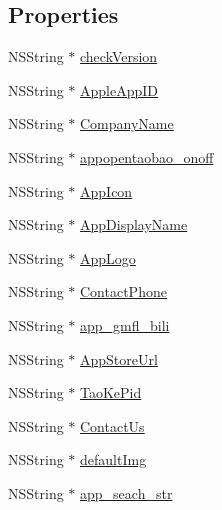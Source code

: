 \subsection*{Properties}
\begin{DoxyCompactItemize}
\item 
N\+S\+String $\ast$ \mbox{\hyperlink{interface_f_n_base_setting_model_a9b61d4642d2dae6e92ced036db029cb7}{check\+Version}}
\item 
N\+S\+String $\ast$ \mbox{\hyperlink{interface_f_n_base_setting_model_aaa406322c65ff07bd8f1f5cb75303974}{Apple\+App\+ID}}
\item 
N\+S\+String $\ast$ \mbox{\hyperlink{interface_f_n_base_setting_model_a66531865767e7f8c301e8d370e1ce1e1}{Company\+Name}}
\item 
N\+S\+String $\ast$ \mbox{\hyperlink{interface_f_n_base_setting_model_adc96e0283db91f335e004db7edbbf956}{appopentaobao\+\_\+onoff}}
\item 
N\+S\+String $\ast$ \mbox{\hyperlink{interface_f_n_base_setting_model_a27fbd5e126e99853380ff89e9192d2ac}{App\+Icon}}
\item 
N\+S\+String $\ast$ \mbox{\hyperlink{interface_f_n_base_setting_model_a602056e898a057d58dba9aa2a76eb600}{App\+Display\+Name}}
\item 
N\+S\+String $\ast$ \mbox{\hyperlink{interface_f_n_base_setting_model_a6a033237efabea0191a943099248ca1a}{App\+Logo}}
\item 
N\+S\+String $\ast$ \mbox{\hyperlink{interface_f_n_base_setting_model_abf35763e23a05df5ebd04beb509e753b}{Contact\+Phone}}
\item 
N\+S\+String $\ast$ \mbox{\hyperlink{interface_f_n_base_setting_model_a81d27cf811e07d3ebf9e23f6293033a1}{app\+\_\+gmfl\+\_\+bili}}
\item 
N\+S\+String $\ast$ \mbox{\hyperlink{interface_f_n_base_setting_model_ac357aa41624525daab07c73e49112327}{App\+Store\+Url}}
\item 
N\+S\+String $\ast$ \mbox{\hyperlink{interface_f_n_base_setting_model_aabacf646255d7eb13a472110ad7f7153}{Tao\+Ke\+Pid}}
\item 
N\+S\+String $\ast$ \mbox{\hyperlink{interface_f_n_base_setting_model_a54c1cdebe81832ff67c60387fe9e2a59}{Contact\+Us}}
\item 
N\+S\+String $\ast$ \mbox{\hyperlink{interface_f_n_base_setting_model_a94ca60b03772aa2eaa39b65c424ded3c}{default\+Img}}
\item 
N\+S\+String $\ast$ \mbox{\hyperlink{interface_f_n_base_setting_model_ae00a0fd8871053f00f45dcc840186524}{app\+\_\+seach\+\_\+str}}

\end{DoxyCompactItemize}
